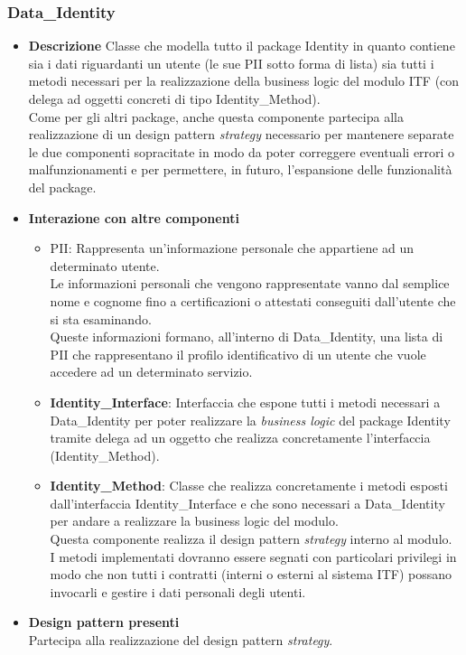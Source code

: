 \subsubsection{Data\_Identity}
\begin{itemize}
	\item \textbf{Descrizione}
	Classe che modella tutto il package Identity in quanto contiene sia i dati riguardanti un utente (le sue \gls{PII} sotto forma di lista) sia tutti i metodi necessari per la realizzazione della business logic del modulo \gls{ITF} (con delega ad oggetti concreti di tipo Identity\_Method).\\
	Come per gli altri package, anche questa componente partecipa alla realizzazione di un design pattern \textit{strategy} necessario per mantenere separate le due componenti sopracitate in modo da poter correggere eventuali errori o malfunzionamenti e per permettere, in futuro, l'espansione delle funzionalità del package.
	\item \textbf{Interazione con altre componenti}
	\begin{itemize}
		\item \gls{PII}: Rappresenta un'informazione personale che appartiene ad un determinato utente.\\
		Le informazioni personali che vengono rappresentate vanno dal semplice nome e cognome fino a certificazioni o attestati conseguiti dall'utente che si sta esaminando.\\
		Queste informazioni formano, all'interno di Data\_Identity, una lista di \gls{PII} che rappresentano il profilo identificativo di un utente che vuole accedere ad un determinato servizio.		
		\item \textbf{Identity\_Interface}: Interfaccia che espone tutti i metodi necessari a Data\_Identity per poter realizzare la \textit{business logic} del package Identity tramite delega ad un oggetto che realizza concretamente l'interfaccia (Identity\_Method).
		\item \textbf{Identity\_Method}: Classe che realizza concretamente i metodi esposti dall'interfaccia Identity\_Interface e che sono necessari a Data\_Identity per andare a realizzare la business logic del modulo.\\
		Questa componente realizza il design pattern \textit{strategy} interno al modulo.\\
		I metodi implementati dovranno essere segnati con particolari privilegi in modo che non tutti i contratti (interni o esterni al sistema \gls{ITF}) possano invocarli e gestire i dati personali degli utenti.	
	\end{itemize}
	\item \textbf{Design pattern presenti}\\
	Partecipa alla realizzazione del design pattern \textit{strategy}.
\end{itemize}
